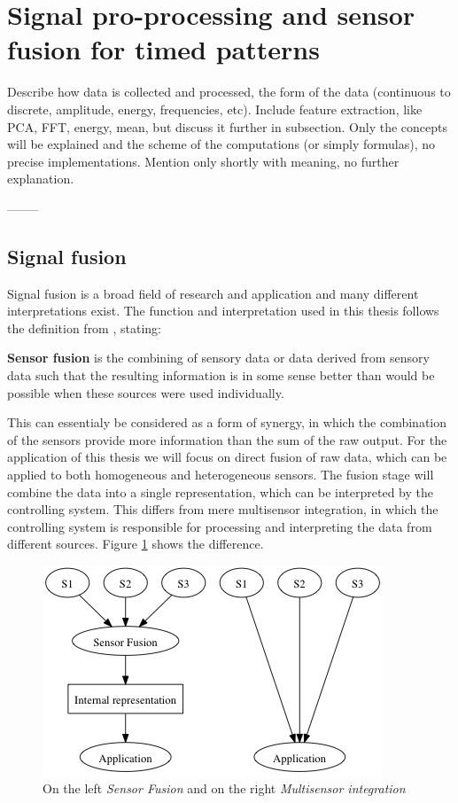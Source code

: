 
\section{Signal pro-processing and sensor fusion for timed patterns}
  Describe how data is collected and processed, the form of the data (continuous to discrete, amplitude, energy, frequencies, etc).
  Include feature extraction, like PCA, FFT, energy, mean, but discuss it further in subsection.
  Only the concepts will be explained and the scheme of the computations (or simply formulas), no precise implementations.
  Mention only shortly with meaning, no further explanation.

  --------


    \subsection{Signal fusion}
    Signal fusion is a broad field of research and application and many different interpretations exist.
    The function and interpretation used in this thesis follows the definition from \cite{elmenreich2001introduction}, stating:
    \begin{center}
      \textbf{Sensor fusion} is the combining of sensory data or data derived from sensory data such that the resulting information is in some sense better than would be possible when these sources were used individually.
    \end{center}
    This can essentialy be considered as a form of synergy, in which the combination of the sensors provide more information than the sum of the raw output.
    For the application of this thesis we will focus on direct fusion of raw data, which can be applied to both homogeneous and heterogeneous sensors.
    The fusion stage will combine the data into a single representation, which can be interpreted by the controlling system.
    This differs from mere multisensor integration, in which the controlling system is responsible for processing and interpreting the data from different sources.
    Figure \ref{fig:sensor_fusion} shows the difference.

    \begin{figure}[htbp]
      \centering
        \includegraphics{./Figures/graphs/sensor_fusion.png}
      \caption[K-means]{On the left \emph{Sensor Fusion} and on the right \emph{Multisensor integration}}
      \label{fig:sensor_fusion}
    \end{figure}


